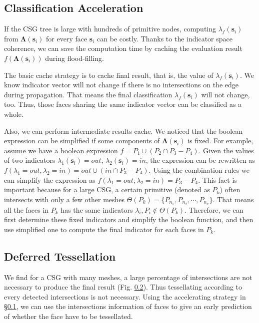 \documentclass[10pt,journal,compsoc]{IEEEtran}
\begin{document}
\subsection{Classification Acceleration}
\label{sec:acc}
If the CSG tree is large with hundreds of primitive nodes, computing $\lambda_f(\bm{s}_i)$ from $\boldsymbol{\Lambda}(\bm{s}_i)$ for every face $\bm{s}_i$ can be costly. Thanks to the indicator space coherence, we can save the computation time by caching the evaluation result $f(\boldsymbol{\Lambda}(\bm{s}_i))$ during flood-filling.

The basic cache strategy is to cache final result, that is, the value of $\lambda_f(\bm{s}_i)$. We know indicator vector will not change if there is no intersections on the edge during propagation. That means the final classification $\lambda_f(\bm{s}_i)$ will not change, too. Thus, those faces sharing the same indicator vector can be classified as a whole.

Also, we can perform intermediate results cache. We noticed that the boolean expression can be simplified if some components of $\boldsymbol{\Lambda}(\bm{s}_i)$ is fixed. For example, assume we have a boolean expression $f = P_1\cup (P_2\cap P_3-P_4)$. Given the values of two indicators $\lambda_1(\bm{s}_i)=out$, $\lambda_2(\bm{s}_i)=in$, the expression can be rewritten as $f(\lambda_1=out, \lambda_2=in)=out\cup (in\cap P_3-P_4)$. Using the combination rules we can simplify the expression as $f(\lambda_1=out, \lambda_2=in)=P_3-P_4$. This fact is important because for a large CSG, a certain primitive (denoted as $P_k$) often intersects with only a few other meshes $\Theta(P_k)= \{P_{n_1}, P_{n_2}, \cdots, P_{n_x}\}$. That means all the faces in $P_k$ has the same indicators $\lambda_{i}, P_{i} \notin \Theta(P_k)$. Therefore, we can first determine these fixed indicators and simplify the boolean function, and then use simplified one to compute the final indicator for each faces in $P_k$.


\subsection{Deferred Tessellation}
We find for a CSG with many meshes, a large percentage of intersections are not necessary to produce the final result (Fig. \ref{}). Thus tessellating according to every detected intersections is not necessary. Using the accelerating strategy in \S\ref{sec:acc}, we can use the intersections information of faces to give an early prediction of whether the face have to be tessellated.
\end{document}
